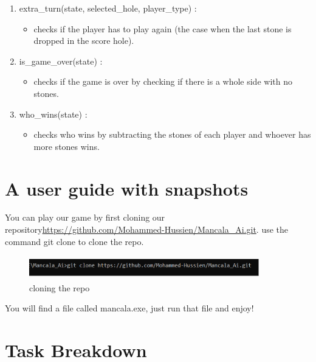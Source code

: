 \begin{enumerate}
    \item extra\_turn(state, selected\_hole, player\_type)   :
    \begin{itemize}
        \item checks if the player has to play again (the case when the last stone is
          dropped in the score hole).
    \end{itemize}



    \item is\_game\_over(state)    :
    \begin{itemize}
        \item checks if the game is over by checking if there is a whole side with no stones.
    \end{itemize}


    \item who\_wins(state)     :
    \begin{itemize}
        \item checks who wins by subtracting the stones of each player and whoever has more stones wins.
    \end{itemize}


    
\end{enumerate}       




\chapter{A user guide with snapshots}
You can play our game by first cloning our repository\url{https://github.com/Mohammed-Hussien/Mancala_Ai.git}. 
use the command git clone to clone the repo.

\begin{figure}[H]
    \centering
    \includegraphics[width=100mm,height=10mm]{Images/git_clone.png}
    \caption{cloning the repo}
  \end{figure}
  \vskip 0.2in
\vskip 0.2in
You will find a file called mancala.exe, just run that file and enjoy!




\chapter{Task Breakdown}

